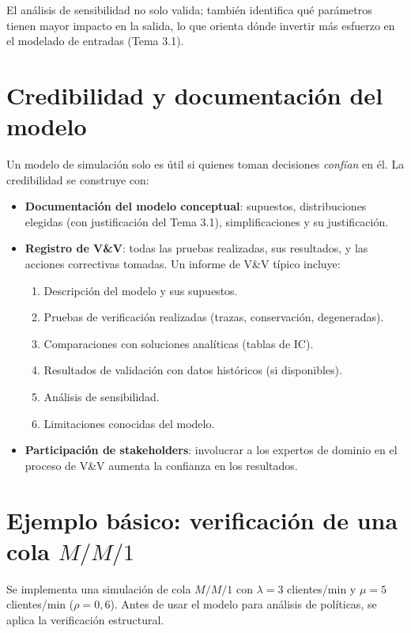 \documentclass[11pt, letterpaper]{article}
\begin{document}
El análisis de sensibilidad no solo valida; también identifica qué parámetros tienen mayor impacto en la salida, lo que orienta dónde invertir más esfuerzo en el modelado de entradas (Tema 3.1).

\section{Credibilidad y documentación del modelo}

Un modelo de simulación solo es útil si quienes toman decisiones \emph{confían} en él. La credibilidad se construye con:

\begin{itemize}
    \item \textbf{Documentación del modelo conceptual}: supuestos, distribuciones elegidas (con justificación del Tema 3.1), simplificaciones y su justificación.
    \item \textbf{Registro de V\&V}: todas las pruebas realizadas, sus resultados, y las acciones correctivas tomadas. Un informe de V\&V típico incluye:
    \begin{enumerate}
        \item Descripción del modelo y sus supuestos.
        \item Pruebas de verificación realizadas (trazas, conservación, degeneradas).
        \item Comparaciones con soluciones analíticas (tablas de IC).
        \item Resultados de validación con datos históricos (si disponibles).
        \item Análisis de sensibilidad.
        \item Limitaciones conocidas del modelo.
    \end{enumerate}
    \item \textbf{Participación de stakeholders}: involucrar a los expertos de dominio en el proceso de V\&V aumenta la confianza en los resultados.
\end{itemize}

\section{Ejemplo básico: verificación de una cola $M/M/1$}

\begin{ejemplobox}[Sistema]
Se implementa una simulación de cola $M/M/1$ con $\lambda=3$ clientes/min y $\mu=5$ clientes/min ($\rho=0{,}6$). Antes de usar el modelo para análisis de políticas, se aplica la verificación estructural.
\end{ejemplobox}
\end{document}
